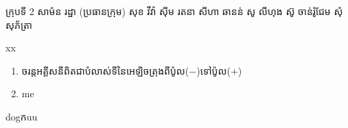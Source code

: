 \documentclass[15pt,a4paper]{article}
\author{james1}
\date{\today}
\newenvironment{kfont}{\khfont}{}
\begin{document}
\hfill\begin{minipage}{.5\linewidth}
\begin{kfont}ក្រុបទី\end{kfont} 2
\begin{kfont}សាម៉ន រដ្ឋា (ប្រធានក្រុម)\end{kfont}
\begin{kfont}សុខ វីវ៉ា\end{kfont}
\begin{kfont}សុីម រតនា\end{kfont}
សីហា ឆានន់ 
សូ លីហុង
 ស៊ូ ចាន់រ៉ូជែម
សុំ សុភ័ត្រា
\end{minipage}
xx
\begin{enumerate}
\item 
\begin{kfont}
ចរន្តអគ្គីសនីពិតជាបំលាស់ទីនៃអេឡិចត្រុងពីប៉ូល(\(-\))ទៅប៉ូល(\(+\))
\end{kfont}
\item 
me
\end{enumerate}
dog\begin{kfont}ក\end{kfont}uu
\end{document}

